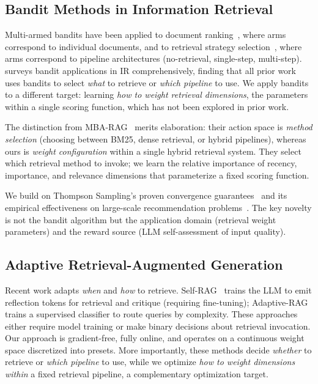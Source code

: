 
\subsection{Bandit Methods in Information Retrieval}

Multi-armed bandits have been applied to document ranking~\citep{radlinski2008learning}, where arms correspond to individual documents, and to retrieval strategy selection~\citep{tang2025mbarag}, where arms correspond to pipeline architectures (no-retrieval, single-step, multi-step).
\citet{glowacka2019bandit} surveys bandit applications in IR comprehensively, finding that all prior work uses bandits to select \emph{what} to retrieve or \emph{which pipeline} to use.
We apply bandits to a different target: learning \emph{how to weight retrieval dimensions}, the parameters within a single scoring function, which has not been explored in prior work.

The distinction from MBA-RAG~\citep{tang2025mbarag} merits elaboration: their action space is \emph{method selection} (choosing between BM25, dense retrieval, or hybrid pipelines), whereas ours is \emph{weight configuration} within a single hybrid retrieval system.
They select which retrieval method to invoke; we learn the relative importance of recency, importance, and relevance dimensions that parameterize a fixed scoring function.

We build on Thompson Sampling's proven convergence guarantees~\citep{agrawal2012analysis,agrawal2013thompson} and its empirical effectiveness on large-scale recommendation problems~\citep{chapelle2011empirical}.
The key novelty is not the bandit algorithm but the application domain (retrieval weight parameters) and the reward source (LLM self-assessment of input quality).

\subsection{Adaptive Retrieval-Augmented Generation}

Recent work adapts \emph{when} and \emph{how} to retrieve.
Self-RAG~\citep{asai2024selfrag} trains the LLM to emit reflection tokens for retrieval and critique (requiring fine-tuning); Adaptive-RAG~\citep{jeong2024adaptiverag} trains a supervised classifier to route queries by complexity.
These approaches either require model training or make binary decisions about retrieval invocation.
Our approach is gradient-free, fully online, and operates on a continuous weight space discretized into presets.
More importantly, these methods decide \emph{whether} to retrieve or \emph{which pipeline} to use, while we optimize \emph{how to weight dimensions within} a fixed retrieval pipeline, a complementary optimization target.

